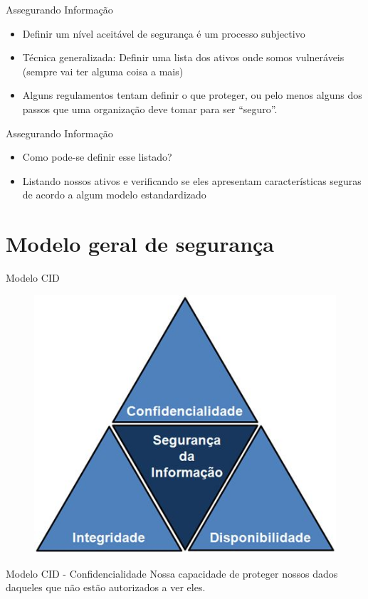 \documentclass{beamer}
\begin{document}
\begin{frame}{Assegurando Informação}
\begin{itemize}
\item Definir um nível aceitável de segurança é um processo subjectivo
\item Técnica generalizada: Definir uma lista dos ativos onde somos vulneráveis (sempre vai ter alguma coisa a mais)
\item Alguns regulamentos tentam definir o que proteger, ou pelo menos alguns dos passos que uma organização deve tomar para ser ``seguro''.
\end{itemize}
\end{frame}

\begin{frame}{Assegurando Informação}
\begin{itemize}
\item Como pode-se definir esse listado?
\item Listando nossos ativos e verificando se eles apresentam características seguras de acordo a algum modelo estandardizado
\end{itemize}
\end{frame}


\section{Modelo geral de segurança}
\begin{frame}{Modelo CID}
\begin{figure}[tbph]
\centering
\includegraphics[width=0.5\linewidth]{./cia1}
\label{fig:cia}
\end{figure}
\end{frame}

\begin{frame}{Modelo CID - Confidencialidade}
Nossa capacidade de proteger nossos dados daqueles que não estão autorizados a ver eles.
\end{frame}
\end{document}
